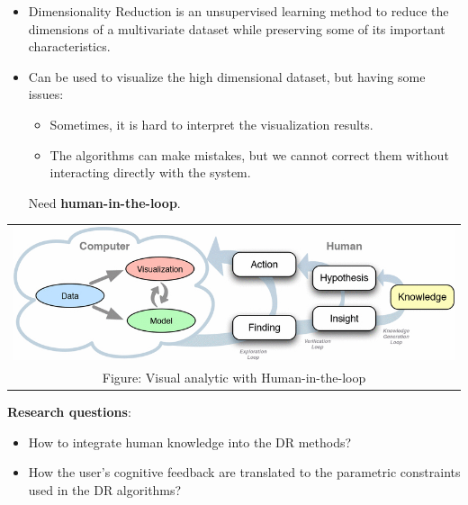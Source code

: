 \documentclass[portrait,final,a0paper]{nadiposter}
\newcommand{\pointer}{\scalebox{1.0}{\ding{43}}}%
\newcommand{\compresslist}{%
\setlength{\itemsep}{1pt}%
\setlength{\parskip}{0pt}%
\setlength{\parsep}{0pt}%
\setlength{\leftmargin}{0pt}%
}
\begin{document}
\begin{poster}
{\begin{minipage}{0.45\linewidth}
\begin{itemize}
    \item Dimensionality Reduction is an {\color{blue} unsupervised learning} method to reduce the dimensions of a multivariate dataset while \qquad preserving some of its important characteristics.
    \item Can be used to {\color{blue}visualize the high dimensional dataset}, but \quad having some issues:
    \noindent
    \begin{itemize}
        \compresslist
        \item Sometimes, it is hard to interpret the visualization results.
        \item The algorithms can make mistakes, but we cannot correct them without interacting directly with the system.
    \end{itemize}
    \scalebox{2}{\pointer} Need \textbf{human-in-the-loop}.
\end{itemize}
\end{minipage}
\begin{minipage}{0.48\linewidth}
\begin{center}
\begin{tabular}{c}
    \includegraphics[width=0.75\linewidth]{poster_idr01_UNamur_2017/figures/ml_with_human.png}\\
    \tiny{Figure: Visual analytic with Human-in-the-loop \cite{Sacha2017Interaction}}
\end{tabular}
\end{center}
\qquad\textbf{Research questions}:
\begin{itemize}
    \compresslist
    \item How to {\color{blue} integrate human knowledge} into the DR methods?
    \item How the user's {\color{blue} cognitive feedback} are translated to the {\color{blue} parametric constraints} used in the DR algorithms?
\end{itemize}
\end{minipage}
}

\end{poster}
\end{document}
